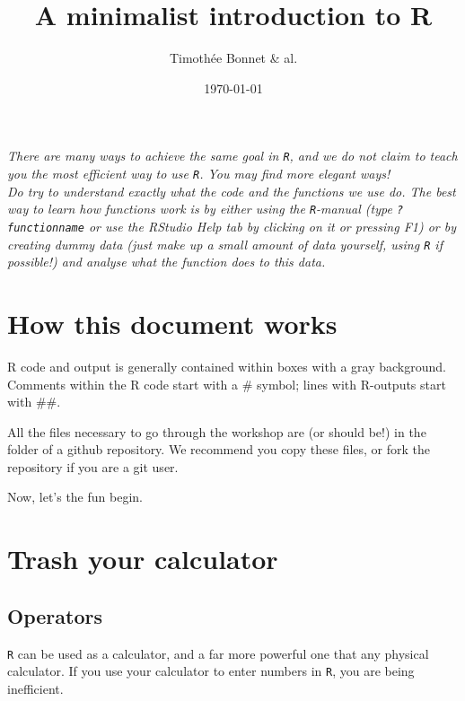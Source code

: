 \documentclass[12pt,a4paper]{scrartcl}\usepackage[]{graphicx}\usepackage[]{color}
\title{A minimalist introduction to R}
\date{\today}
\author{Timothée Bonnet \& al.}
\begin{document}
\maketitle

\tableofcontents



\vspace{2cm}
\begin{mdframed}
\textit{There are many ways to achieve the same goal in \texttt{R}, and we do not claim to teach you the most efficient way to use \texttt{R}. You may find more elegant ways! \\[1.5ex] 
Do try to understand exactly what the code and the functions we use do. The best way to learn how functions work is by either using the \texttt{R}-manual (type \texttt{?functionname} or use the RStudio Help tab by clicking on it or pressing F1) or by creating dummy data (just make up a small amount of data yourself, using \texttt{R} if possible!) and analyse what the function does to this data.}
\end{mdframed}
\newpage

\section*{How this document works}
R code and output is generally contained within boxes with a gray background. Comments within the R code start with a \# symbol; lines with R-outputs start with \#\#.

All the files necessary to go through the workshop are (or should be!) in the folder of a github repository. We recommend you copy these files, or fork the repository if you are a git user.

Now, let's the fun begin.

\section{Trash your calculator}
\subsection{Operators}
\texttt{R} can be used as a calculator, and a far more powerful one that any physical calculator. If you use your calculator to enter numbers in \texttt{R}, you are being inefficient.
\end{document}
